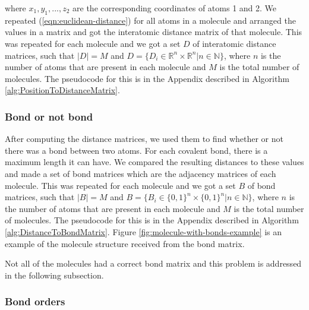 where $x_1, y_1, ..., z_2$ are the corresponding coordinates of atoms 1 and 2. We repeated (\ref{eqn:euclidean-distance}) for all atoms in a molecule and arranged the values in a matrix and got the interatomic distance matrix of that molecule. This was repeated for each molecule and we got a set $D$ of interatomic distance matrices, such that $|D| = M$ and $D = \{ D_i \in \mathbb{R}^n\times \mathbb{R}^n | n \in \mathbb{N} \}$, where $n$ is the number of atoms that are present in each molecule and $M$ is the total number of molecules. The pseudocode for this is in the Appendix described in Algorithm \ref{alg:PositionToDistanceMatrix}.

\subsubsection{Bond or not bond}

After computing the distance matrices, we used them to find whether or not there was a bond between two atoms. For each covalent bond, there is a maximum length it can have. We compared the resulting distances to these values and made a set of bond matrices which are the adjacency matrices of each molecule. This was repeated for each molecule and we got a set $B$ of bond matrices, such that $|B| = M$ and $B = \{ B_i \in \{0, 1\}^n\times \{0, 1\}^n | n \in \mathbb{N} \}$, where $n$ is the number of atoms that are present in each molecule and $M$ is the total number of molecules. The pseudocode for this is in the Appendix described in Algorithm \ref{alg:DistanceToBondMatrix}. Figure \ref{fig:molecule-with-bonds-example} is an example of the molecule structure received from the bond matrix.

Not all of the molecules had a correct bond matrix and this problem is addressed in the following subsection.

\begin{Figure}
    \centering
    
    \captionsetup{width=.9\linewidth}
    \label{fig:molecule-with-bonds-example}
\end{Figure}

\subsubsection{Bond orders}
\label{sec:bond-orders}

